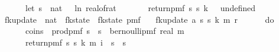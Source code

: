 \begin{isabellebody}
\ \ \ \ \ \ let\ s\ {\isacharequal}{\kern0pt}\ nat\ {\isasymlceil}{\isacharminus}{\kern0pt}{}{}\ {\isacharasterisk}{\kern0pt}\ ln\ {\isacharparenleft}{\kern0pt}real{\isacharunderscore}{\kern0pt}of{\isacharunderscore}{\kern0pt}rat\ {\isasymepsilon}{\isacharparenright}{\kern0pt}{\isasymrceil}{\isacharsemicolon}{\kern0pt}\isanewline
\ \ \ \ \ \ return{\isacharunderscore}{\kern0pt}pmf\ {\isacharparenleft}{\kern0pt}s\ s\ k{\isacharcomma}{\kern0pt}\ {}{\isacharcomma}{\kern0pt}\ {\isacharparenleft}{\kern0pt}{\isasymlambda}{\isacharunderscore}{\kern0pt}{\isachardot}{\kern0pt}\ undefined{\isacharparenright}{\kern0pt}{\isacharparenright}{\kern0pt}\isanewline
\ \ \ \ {\isacharbraceright}{\kern0pt}{\isachardoublequoteclose}\isanewline
\isanewline
{}\isamarkupfalse%
\ fk{\isacharunderscore}{\kern0pt}update\ {\isacharcolon}{\kern0pt}{\isacharcolon}{\kern0pt}\ {\isachardoublequoteopen}nat\ {\isasymRightarrow}\ fk{\isacharunderscore}{\kern0pt}state\ {\isasymRightarrow}\ fk{\isacharunderscore}{\kern0pt}state\ pmf{\isachardoublequoteclose}\ \isanewline
\ \ {\isachardoublequoteopen}fk{\isacharunderscore}{\kern0pt}update\ a\ {\isacharparenleft}{\kern0pt}s\ s\ k{\isacharcomma}{\kern0pt}\ m{\isacharcomma}{\kern0pt}\ r{\isacharparenright}{\kern0pt}\ {\isacharequal}{\kern0pt}\ \isanewline
\ \ \ \ do\ {\isacharbraceleft}{\kern0pt}\isanewline
\ \ \ \ \ \ coins\ {\isasymleftarrow}\ prod{\isacharunderscore}{\kern0pt}pmf\ {\isacharparenleft}{\kern0pt}{\isacharbraceleft}{\kern0pt}{}{\isachardot}{\kern0pt}{\isachardot}{\kern0pt}{\isacharless}{\kern0pt}s\ {\isasymtimes}\ {\isacharbraceleft}{\kern0pt}{}{\isachardot}{\kern0pt}{\isachardot}{\kern0pt}{\isacharless}{\kern0pt}s\ {\isacharparenleft}{\kern0pt}{\isasymlambda}{\isacharunderscore}{\kern0pt}{\isachardot}{\kern0pt}\ bernoulli{\isacharunderscore}{\kern0pt}pmf\ {\isacharparenleft}{\kern0pt}{}{\isacharslash}{\kern0pt}{\isacharparenleft}{\kern0pt}real\ m{\isacharplus}{\kern0pt}{}{\isacharparenright}{\kern0pt}{\isacharparenright}{\kern0pt}{\isacharparenright}{\kern0pt}{\isacharsemicolon}{\kern0pt}\isanewline
\ \ \ \ \ \ return{\isacharunderscore}{\kern0pt}pmf\ {\isacharparenleft}{\kern0pt}s\ s\ k{\isacharcomma}{\kern0pt}\ m{\isacharplus}{\kern0pt}{}{\isacharcomma}{\kern0pt}\ {\isasymlambda}i\ {\isasymin}\ {\isacharbraceleft}{\kern0pt}{}{\isachardot}{\kern0pt}{\isachardot}{\kern0pt}{\isacharless}{\kern0pt}s\ {\isasymtimes}\ {\isacharbraceleft}{\kern0pt}{}{\isachardot}{\kern0pt}{\isachardot}{\kern0pt}{\isacharless}{\kern0pt}s\ \isanewline

\end{isabellebody}
